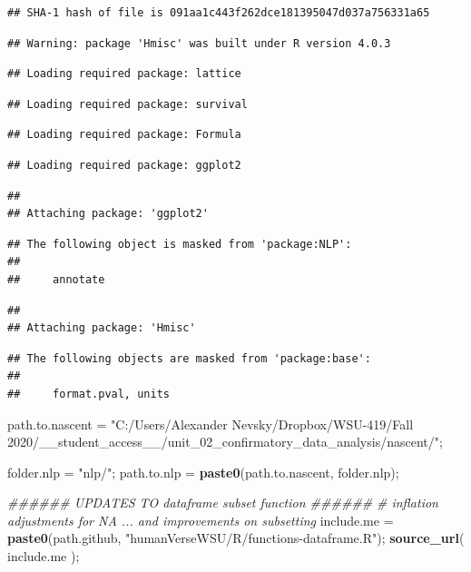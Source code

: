 \documentclass[]{article}
\newenvironment{Shaded}{\begin{snugshade}}{\end{snugshade}}
\newcommand{\CommentTok}[1]{\textcolor[rgb]{0.56,0.35,0.01}{\textit{#1}}}
\newcommand{\KeywordTok}[1]{\textcolor[rgb]{0.13,0.29,0.53}{\textbf{#1}}}
\newcommand{\NormalTok}[1]{#1}
\newcommand{\StringTok}[1]{\textcolor[rgb]{0.31,0.60,0.02}{#1}}
\begin{document}
\begin{verbatim}
## SHA-1 hash of file is 091aa1c443f262dce181395047d037a756331a65
\end{verbatim}

\begin{verbatim}
## Warning: package 'Hmisc' was built under R version 4.0.3
\end{verbatim}

\begin{verbatim}
## Loading required package: lattice
\end{verbatim}

\begin{verbatim}
## Loading required package: survival
\end{verbatim}

\begin{verbatim}
## Loading required package: Formula
\end{verbatim}

\begin{verbatim}
## Loading required package: ggplot2
\end{verbatim}

\begin{verbatim}
## 
## Attaching package: 'ggplot2'
\end{verbatim}

\begin{verbatim}
## The following object is masked from 'package:NLP':
## 
##     annotate
\end{verbatim}

\begin{verbatim}
## 
## Attaching package: 'Hmisc'
\end{verbatim}

\begin{verbatim}
## The following objects are masked from 'package:base':
## 
##     format.pval, units
\end{verbatim}

\begin{Shaded}
\begin{Highlighting}[]
\NormalTok{path.to.nascent =}\StringTok{ "C:/Users/Alexander Nevsky/Dropbox/WSU{-}419/Fall 2020/\_\_student\_access\_\_/unit\_02\_confirmatory\_data\_analysis/nascent/"}\NormalTok{;}

\NormalTok{folder.nlp =}\StringTok{ "nlp/"}\NormalTok{;}
\NormalTok{path.to.nlp =}\StringTok{ }\KeywordTok{paste0}\NormalTok{(path.to.nascent, folder.nlp);}


\CommentTok{\#\#\#\#\#\# UPDATES TO dataframe subset function \#\#\#\#\#\#}
\CommentTok{\# inflation adjustments for NA ... and improvements on subsetting}
\NormalTok{include.me =}\StringTok{ }\KeywordTok{paste0}\NormalTok{(path.github, }\StringTok{"humanVerseWSU/R/functions{-}dataframe.R"}\NormalTok{);}
\KeywordTok{source\_url}\NormalTok{( include.me );}
\end{Highlighting}
\end{Shaded}
\end{document}
